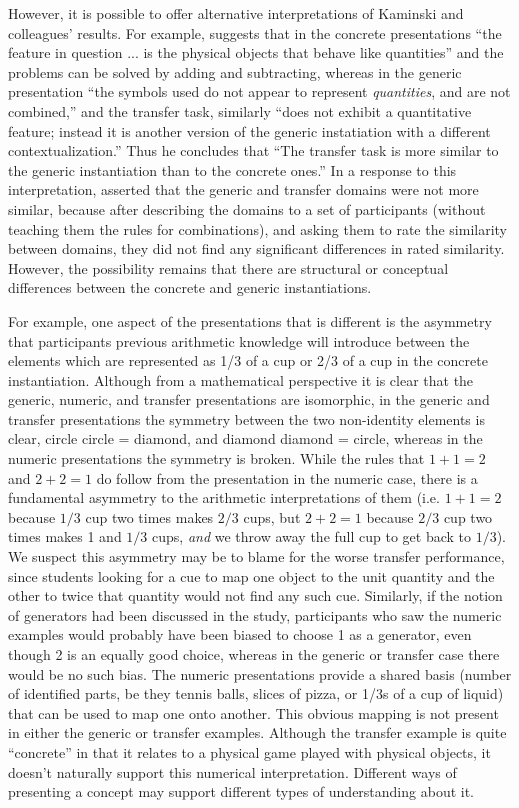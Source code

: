 \documentclass[man,10pt]{apa6}
\begin{document}
\noindent
However, it is possible to offer alternative interpretations of Kaminski and colleagues' results. For example,  suggests that in the concrete presentations ``the feature in question ... is the physical objects that behave like quantities'' and the problems can be solved by adding and subtracting, whereas in the generic presentation ``the symbols used do not appear to represent \emph{quantities}, and are not combined,'' and the transfer task, similarly ``does not exhibit a quantitative feature; instead it is another version of the generic instatiation with a different contextualization.'' Thus he concludes that ``The transfer task is more similar to the generic instantiation than to the concrete ones.'' In a response to this interpretation,  asserted that the generic and transfer domains were not more similar, because after describing the domains to a set of participants (without teaching them the rules for combinations), and asking them to rate the similarity between domains, they did not find any significant differences in rated similarity. However, the possibility remains that there are structural or conceptual differences between the concrete and generic instantiations. \par
For example, one aspect of the presentations that is different is the asymmetry that participants previous arithmetic knowledge will introduce between the elements which are represented as 1/3 of a cup or 2/3 of a cup in the concrete instantiation. Although from a mathematical perspective it is clear that the generic, numeric, and transfer presentations are isomorphic, in the generic and transfer presentations the symmetry between the two non-identity elements is clear, circle circle = diamond, and diamond diamond = circle, whereas in the numeric presentations the symmetry is broken. While the rules that $1+1=2$ and $2+2=1$ do follow from the presentation in the numeric case, there is a fundamental asymmetry to the arithmetic interpretations of them (i.e. $1+1 = 2$ because $1/3$ cup two times makes $2/3$ cups, but $2+2 = 1$ because $2/3$ cup two times makes 1 and $1/3$ cups, \emph{and} we throw away the full cup to get back to $1/3$). We suspect this asymmetry may be to blame for the worse transfer performance, since students looking for a cue to map one object to the unit quantity and the other to twice that quantity would not find any such cue. Similarly, if the notion of generators had been discussed in the study, participants who saw the numeric examples would probably have been biased to choose 1 as a generator, even though 2 is an equally good choice, whereas in the generic or transfer case there would be no such bias. The numeric presentations provide a shared basis (number of identified parts, be they tennis balls, slices of pizza, or 1/3s of a cup of liquid) that can be used to map one onto another. This obvious mapping is not present in either the generic or transfer examples. Although the transfer example is quite ``concrete'' in that it relates to a physical game played with physical objects, it doesn't naturally support this numerical interpretation. Different ways of presenting a concept may support different types of understanding about it.\par
\end{document}
